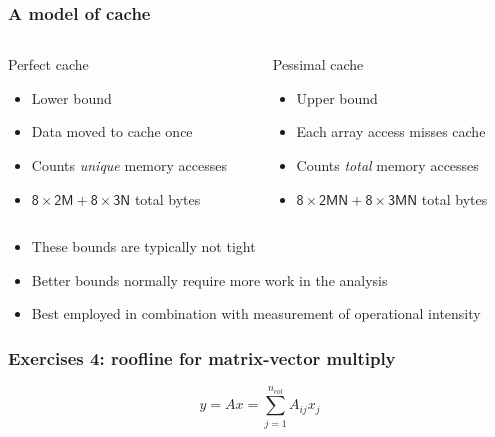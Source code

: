\documentclass[dvipsnames,presentation,aspectratio=169,14pt]{beamer}
\begin{document}
\begin{frame}[fragile]
  \frametitle{A model of cache}
  \vskip -8pt
  \small

  \begin{columns}[t]
    \begin{column}{0.48\textwidth}
      \begin{solutionblock}{Perfect cache}
        \begin{itemize}[itemsep=0pt, wide=0pt]
        \item Lower bound
        \item Data moved to cache once
        \item Counts \emph{unique} memory accesses
        \item $\mathsf{8\times 2M + 8\times 3N}$ total bytes
        \end{itemize}
      \end{solutionblock}
    \end{column}
    \begin{column}{0.48\textwidth}
      \begin{challenge}{Pessimal cache}
        \begin{itemize}[itemsep=0pt, wide=0pt]
        \item Upper bound
        \item Each array access misses cache
        \item Counts \emph{total} memory accesses
        \item $\mathsf{8 \times 2MN + 8\times 3MN}$ total bytes
        \end{itemize}
      \end{challenge}
    \end{column}
  \end{columns}

  \vskip 13pt

  \begin{itemize}[itemsep=4pt]
  \item These bounds are typically not tight

  \item Better bounds normally require more work in the analysis

  \item Best employed in combination with measurement of operational intensity
  \end{itemize}
\end{frame}

\begin{frame}
  \frametitle{Exercises 4: roofline for matrix-vector multiply}


  \begin{equation*}
    y = A x = \sum_{j=1}^{n_{col}} A_{ij} x_j
  \end{equation*}
\end{frame}
\end{document}
